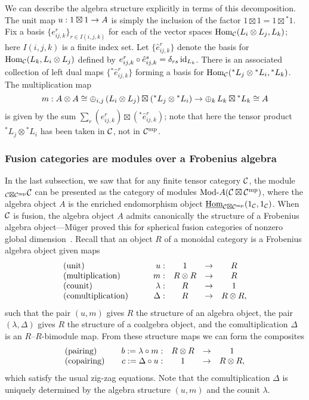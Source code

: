 \documentclass{amsart}
\begin{document}
We can describe the algebra structure explicitly in terms of this decomposition.  The unit map $u: 1 \boxtimes 1 \rightarrow A$ is simply the inclusion of the factor $1 \boxtimes 1 = 1 \boxtimes {}^*1$.  Fix a basis $\{e^r_{ij,k}\}_{r \in I(i,j,k)}$ for each of the vector spaces $\operatorname{Hom}_\mathcal C(L_i \otimes L_j,L_k)$; here $I(i,j,k)$ is a finite index set.  Let $\{\hat{e}^r_{ij,k}\}$ denote the basis for $\operatorname{Hom}_\mathcal C(L_k,L_i \otimes L_j)$ defined by $e^r_{ij,k} \circ \hat{e}^s_{ij,k} = \delta_{rs} \, \mathrm{id}_{L_k}$.  There is an associated collection of left dual maps $\{{}^*\hat{e}^r_{ij,k}\}$ forming a basis for $\operatorname{Hom}_\mathcal C({}^* L_j \otimes {}^* L_i, {}^* L_k)$.  The multiplication map
\[
m: A \otimes A \cong \oplus_{i,j} \, (L_i \otimes L_j) \boxtimes ({}^* L_j \otimes {}^* L_i) \rightarrow \oplus_k \, L_k \boxtimes {}^* L_k \cong A
\]
is given by the sum $\sum_r (e^r_{ij,k}) \boxtimes ({}^*\hat{e}^r_{ij,k})$; note that here the tensor product ${}^* L_j \otimes {}^* L_i$ has been taken in $\mathcal C$, not in $\mathcal C^{\mathrm{mp}}$.

\subsubsection{Fusion categories are modules over a Frobenius algebra}

In the last subsection, we saw that for any finite tensor category $\mathcal C$, the module ${}_{\mathcal C \boxtimes \mathcal C^{\mathrm{mp}}} \mathcal C$ can be presented as the category of modules $\Mod{}{A}(\cC \boxtimes \cC^\mp)$, where the algebra object $A$ is the enriched endomorphism object $\operatorname{\underline{Hom}}_{\mathcal C \boxtimes \mathcal C^{\mathrm{mp}}}(1_\mathcal C,1_\mathcal C)$.  When $\mathcal C$ is fusion, the algebra object $A$ admits canonically the structure of a Frobenius algebra object---M\"uger proved this for spherical fusion categories of nonzero global dimension~\cite{MR1966525}.  Recall that an object $R$ of a monoidal category is a Frobenius algebra object given maps
\begin{equation*}
	\begin{array}{l c  r c c c}
		\textrm{(unit)} & \quad & u: & 1 & \to & R \\
		\textrm{(multiplication)} && m: & R \otimes R & \to & R \\
		\textrm{(counit)} && \lambda: & R &\to &1 \\
		\textrm{(comultiplication)} && \Delta: & R &\to& R \otimes R,
	\end{array}
\end{equation*}
such that the pair $(u,m)$ gives $R$ the structure of an algebra object, the pair $(\lambda, \Delta)$ gives $R$ the structure of a coalgebra object, and the comultiplication $\Delta$ is an $R$--$R$-bimodule map.  From these structure maps we can form the composites
\begin{equation*}
	\begin{array}{l c  r c c c}
		\textrm{(pairing)} && b := \lambda \circ m: & R \otimes R& \to& 1 \\
		\textrm{(copairing)} && c := \Delta \circ u: & 1&\to&  R \otimes R,
	\end{array}
\end{equation*}
which satisfy the usual zig-zag equations.  Note that the comultiplication $\Delta$ is uniquely determined by the algebra structure $(u,m)$ and the counit $\lambda$.
\end{document}
